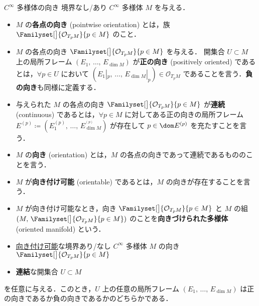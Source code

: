 \documentclass[geometry_main]{subfiles}
\begin{document}
\begin{mydef}[label=def:smooth-orientation]{$C^\infty$ 多様体の向き}
    境界なし/あり $C^\infty$ 多様体 $M$ を与える．
    \begin{itemize}
        \item $M$ の\textbf{各点の向き} (pointwise orientation) とは，族 $\Familyset[\big]{\mathcal{O}_{T_p M}}{p \in M}$ のこと．
        \item $M$ の各点の向き $\Familyset[\big]{\mathcal{O}_{T_p M}}{p \in M}$ を与える．
        開集合 $U \subset M$ 上の局所フレーム $(E_1,\, \dots,\, E_{\dim M})$ が\textbf{正の向き} (positively oriented) であるとは，$\forall p \in U$ において $(E_1|_p,\, \dots,\, E_{\dim M}|_p) \in \mathcal{O}_{T_p M}$ であることを言う．\textbf{負の向き}も同様に定義する．
        \item 与えられた $M$ の各点の向き $\Familyset[\big]{\mathcal{O}_{T_p M}}{p \in M}$ が\textbf{連続} (continuous) であるとは，$\forall p \in M$ に対してある正の向きの局所フレーム $E^{(p)} \coloneqq (E^{(p)}_1,\, \dots,\, E^{^{(p)}}_{\dim M})$ が存在して $p \in \dom E^{(p)}$ を充たすことを言う．
        \item $M$ の\textbf{向き} (orientation) とは，$M$ の各点の向きであって連続であるもののことを言う．
        \item $M$ が\textbf{向き付け可能} (orientable) であるとは，$M$ の向きが存在することを言う．
        \item $M$ が向き付け可能なとき，向き $\Familyset[\big]{\mathcal{O}_{T_p M}}{p \in M}$ と $M$ の組 $(M,\, \Familyset[\big]{\mathcal{O}_{T_p M}}{p \in M})$ のことを\textbf{向きづけられた多様体} (oriented manifold) という．
    \end{itemize}
\end{mydef}

\begin{mylem}[label=lem:orientation]{}
    \begin{itemize}
        \item \hyperref[def:smooth-orientation]{向き付け可能}な境界あり/なし $C^\infty$ 多様体 $M$ の向き $\Familyset[\big]{\mathcal{O}_{T_p M}}{p \in M}$ 
        \item \textbf{連結}な開集合 $U \subset M$
    \end{itemize}
    を任意に与える．このとき，$U$ 上の任意の局所フレーム $(E_1,\, \dots,\, E_{\dim M})$ は正の向きであるか負の向きであるかのどちらかである．
\end{mylem}
\end{document}
